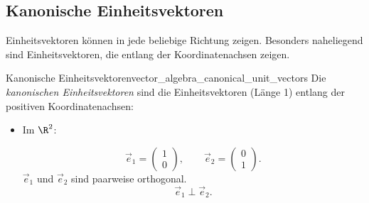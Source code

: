 \subsection{Kanonische Einheitsvektoren}
\label{subsec:vector_algebra_canonical_unit_vectors}

Einheitsvektoren können in jede beliebige Richtung zeigen. Besonders
naheliegend sind Einheitsvektoren, die entlang der Koordinatenachsen zeigen.

\begin{DefinitionBox}{Kanonische Einheitsvektoren}{vector_algebra_canonical_unit_vectors}
  Die \emph{kanonischen Einheitsvektoren}
   sind die Einheitsvektoren (Länge 1) entlang der
  positiven Koordinatenachsen:
  \begin{itemize}[leftmargin=1.5em,itemsep=0.9em]
    \item Im $\R^2$:
      \par\smallskip
      \begin{minipage}[c]{0.47\linewidth}
        \[
          \vec e_1=\begin{pmatrix}1\\0\end{pmatrix},
          \qquad
          \vec e_2=\begin{pmatrix}0\\1\end{pmatrix}.
        \]
        \vspace{0.5cm}
        $\vec e_1$ und $\vec e_2$ sind paarweise orthogonal.
        \[
          \vec e_1\perp\vec e_2.
        \]
      \end{minipage}\hfill
      \begin{minipage}[c]{0.47\linewidth}
        \centering
      \end{minipage}


\end{itemize}
\end{DefinitionBox}
